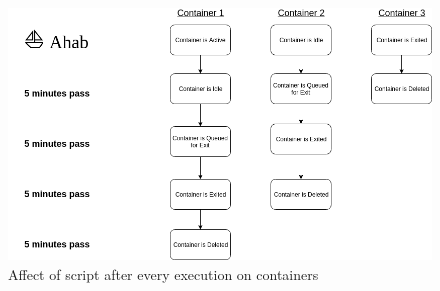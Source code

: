 \begin{figure}[h!]
    \centering
    \includegraphics[width=\linewidth]{res/Ahab.png}
    \caption{Affect of script after every execution on containers}
    \label{fig:ahab-diagram}
\end{figure}

\pagebreak
